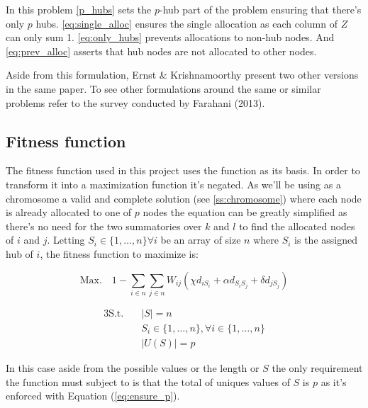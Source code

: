 In this problem \eqref{p_hubs} sets the $p$-hub part of the problem ensuring that there's
only $p$ hubs. \eqref{eq:single_alloc} ensures the single allocation as  each column of
$Z$ can only sum 1. \eqref{eq:only_hubs} prevents allocations to non-hub nodes. And
\eqref{eq:prev_alloc} asserts that hub nodes are not allocated to other nodes.

Aside from this formulation, Ernst \& Krishnamoorthy present two other versions in the
same paper\cite{Ernst1996}. To see other formulations around the same or similar problems
refer to the survey conducted by Farahani (2013)\cite{Farahani2013}.

\subsection{Fitness function}

The fitness function used in this project uses the  function as its basis.
In order to transform it into a maximization function it's negated. As we'll be using as a
chromosome a valid and complete solution (see \ref{ss:chromosome}) 
where each node is already allocated to one of $p$ nodes the equation can be greatly simplified
as there's no need for the two summatories over $k$ and $l$ to find the allocated nodes of $i$
and $j$. Letting $S_{i} \in \{1,\dots,n\} \forall i$ be an array of size $n$ where $S_{i}$
is the assigned hub of $i$, the fitness function to maximize is:

\[
  \text{Max.} \quad 1 - \sum_{i \in n} \sum_{j \in n} W_{ij} (\chi d_{iS_{i}} + \alpha d_{S_{i}S_{j}} + \delta d_{jS_{j}})
\]

\begin{alignat}{3}
  \text{S.t.} \quad & |S| = n \\
                    & S_{i} \in \{1,\dots,n\}, \forall i \in \{1,\dots,n\} \\
   & |U(S)| = p \label{eq:ensure_p}
\end{alignat}

In this case aside from the possible values or the length or $S$ the only requirement
the function must subject to is that the total of uniques values of $S$ is $p$
as it's enforced with Equation (\ref{eq:ensure_p}).
